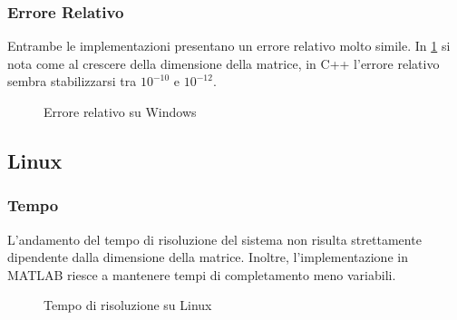 \documentclass[11pt,italian]{article}
\begin{document}
\smallskip
\subsubsection*{Errore Relativo}
Entrambe le implementazioni presentano un errore relativo molto simile.
In \cref{fig:windows-error} si nota come al crescere della dimensione della matrice, in C++ l'errore relativo sembra stabilizzarsi tra $10^{-10}$ e $10^{-12}$.
\begin{figure}[H]
    \caption{Errore relativo su Windows}
    \label{fig:windows-error}
\end{figure}

\subsection{Linux}
\subsubsection*{Tempo}
L'andamento del tempo di risoluzione del sistema non risulta strettamente dipendente dalla dimensione della matrice. Inoltre, l'implementazione in MATLAB riesce a mantenere tempi di completamento meno variabili.
\begin{figure}[H]
    \caption{Tempo di risoluzione su Linux}
    \label{fig:linux-time}
\end{figure}
\end{document}
